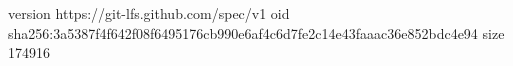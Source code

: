 version https://git-lfs.github.com/spec/v1
oid sha256:3a5387f4f642f08f6495176cb990e6af4c6d7fe2c14e43faaac36e852bdc4e94
size 174916

